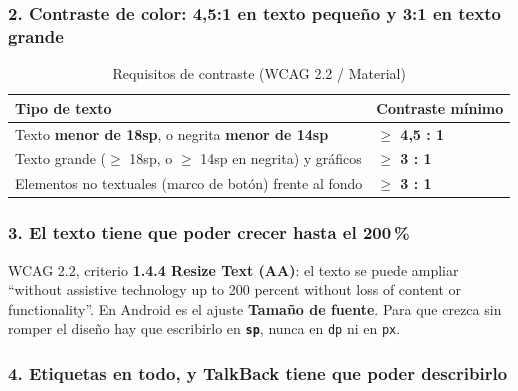 \documentclass[11pt,a4paper]{article}
\newcommand{\code}[1]{\texttt{\color{ink}#1}}
\begin{document}
	\subsubsection*{2. Contraste de color: 4,5:1 en texto pequeño y 3:1 en texto grande}
	
	\begin{table}[htbp]
		\centering
		\small
		\begin{tabularx}{\textwidth}{@{}>{\RaggedRight\arraybackslash}p{6cm} >{\RaggedRight\arraybackslash}X@{}}
			\toprule
			\rowcolor{primary}
			\textcolor{paper}{\sffamily\bfseries Tipo de texto} & \textcolor{paper}{\sffamily\bfseries Contraste mínimo} \\
			\midrule
			Texto \textbf{menor de 18sp}, o negrita \textbf{menor de 14sp} & \textbf{$\geq$ 4,5 : 1} \\
			\rowcolor{soft}
			Texto grande ($\geq$ 18sp, o $\geq$ 14sp en negrita) y gráficos & \textbf{$\geq$ 3 : 1} \\
			Elementos no textuales (marco de botón) frente al fondo & \textbf{$\geq$ 3 : 1} \\
			\bottomrule
		\end{tabularx}
		\caption{Requisitos de contraste (WCAG 2.2 / Material)}
	\end{table}
	
	\subsubsection*{3. El texto tiene que poder crecer hasta el 200\,\%}
	
	WCAG 2.2, criterio \textbf{1.4.4 Resize Text (AA)}: el texto se puede ampliar \enquote{without assistive technology up to 200 percent without loss of content or functionality}. En Android es el ajuste \textbf{Tamaño de fuente}. Para que crezca sin romper el diseño hay que escribirlo en \textbf{\code{sp}}, nunca en \code{dp} ni en \code{px}.
	
	\subsubsection*{4. Etiquetas en todo, y TalkBack tiene que poder describirlo}
	
\end{document}
